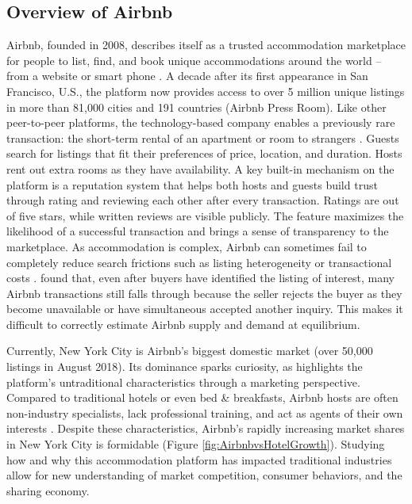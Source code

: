 \documentclass[12pt]{article}
\begin{document}
		\subsection{Overview of Airbnb}
			Airbnb, founded in 2008, describes itself as a trusted accommodation marketplace for people to list, find, and book unique accommodations around the world – from a website or smart phone \citep{farronato2018welfare}. A decade after its first appearance in San Francisco, U.S., the platform now provides access to over 5 million unique listings in more than 81,000 cities and 191 countries (Airbnb Press Room). Like other peer-to-peer platforms, the technology-based company enables a previously rare transaction: the short-term rental of an apartment or room to strangers \citep{farronato2018welfare}. Guests search for listings that fit their preferences of price, location, and duration. Hosts rent out extra rooms as they have availability. A key built-in mechanism on the platform is a reputation system that helps both hosts and guests build trust through rating and reviewing each other after every transaction. Ratings are out of five stars, while written reviews are visible publicly. The feature maximizes the likelihood of a successful transaction and brings a sense of transparency to the marketplace. As accommodation is complex, Airbnb can sometimes fail to completely reduce search frictions such as listing heterogeneity or transactional costs \citep{einav2016peer}. \citet{horton2014misdirected} found that, even after buyers have identified the listing of interest, many Airbnb transactions still falls through because the seller rejects the buyer as they become unavailable or have simultaneous accepted another inquiry. This makes it difficult to correctly estimate Airbnb supply and demand at equilibrium.
			
			\par
			Currently, New York City is Airbnb's biggest domestic market (over 50,000 listings in August 2018). Its dominance sparks curiosity, as \citet{yang2017customers} highlights the platform’s untraditional characteristics through a marketing perspective. Compared to traditional hotels or even bed \& breakfasts, Airbnb hosts are often non-industry specialists, lack professional training, and act as agents of their own interests \citep{yang2017customers}. Despite these characteristics, Airbnb's rapidly increasing market shares in New York City is formidable (Figure \ref{fig:AirbnbvsHotelGrowth}). Studying how and why this accommodation platform has impacted traditional industries allow for new understanding of market competition, consumer behaviors, and the sharing economy.
			
\end{document}
